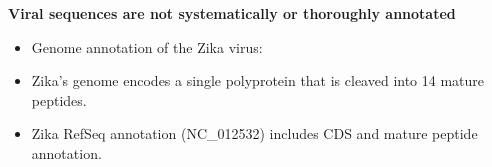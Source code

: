 \documentclass[landscape]{slides}
\begin{document}
\begin{slide}
\begin{center}
\vfill

\end{center}
\end{slide}

\begin{slide}
\begin{center}
\textbf{Viral sequences are not systematically or thoroughly annotated}
\end{center}
\medskip

\small
\begin{itemize}
\item Genome annotation of the Zika virus:
\end{itemize}  


\begin{itemize}
\item Zika's genome encodes a single polyprotein that is cleaved into 14 mature peptides.
\item Zika RefSeq annotation (NC\_012532) includes CDS and mature peptide annotation.
\end{itemize}

\vfill
\tiny {}
\end{slide}
\end{document}
